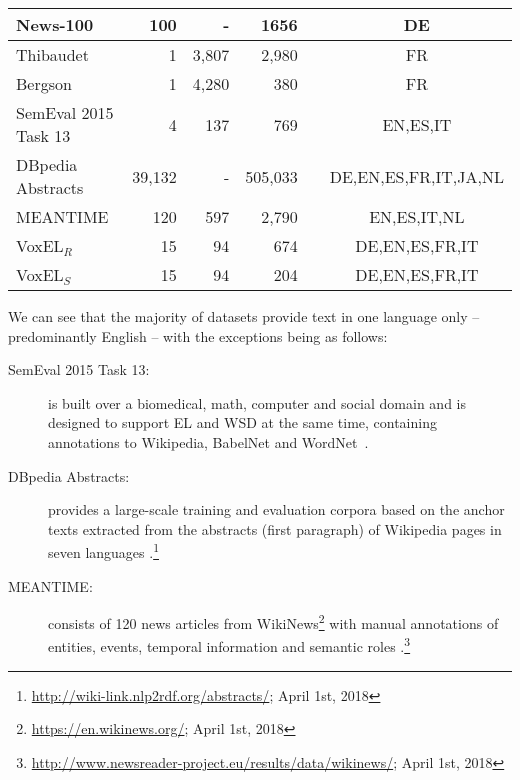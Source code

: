 \documentclass{llncs}
\newcommand{\cmark}{\ding{51}}%
\newcommand{\xmark}{\ding{55}}%
\begin{document}
\begin{table}[tb!]
{\begin{tabular}{lrrrcc}
News-100~\cite{n3}                  &100     &-      &1656    &\cmark  &DE \\\midrule
Thibaudet~\cite{renden2016}         &1       &3,807  &2,980   &\xmark  &FR \\\midrule
Bergson~\cite{renden2016}           &1       &4,280  &380     &\xmark  &FR \\\midrule
SemEval 2015 
Task 13~\cite{moro2015semeval}      &4       &137    &769     &\cmark &EN,ES,IT \\ \midrule
DBpedia Abstracts
~\cite{abstracts2016}               &39,132  &-      &505,033 &\xmark &DE,EN,ES,FR,IT,JA,NL \\\midrule
MEANTIME \cite{meantime2016}        &120     &597    &2,790   &\cmark &EN,ES,IT,NL \\\midrule 
VoxEL$_R$                           &15      &94     &674     &\cmark &DE,EN,ES,FR,IT\\\midrule  
VoxEL$_S$                           &15      &94     &204     &\cmark &DE,EN,ES,FR,IT\\ 
\bottomrule
\end{tabular}
}
\end{table}

We can see that the majority of datasets provide text in one language only -- predominantly English -- with the exceptions being as follows: 

\begin{description}
\item[SemEval 2015 Task 13:] is built over a biomedical, math, computer and social domain and is designed to support EL and WSD at the same time, containing annotations to Wikipedia, BabelNet and WordNet~\cite{moro2015semeval}.
\item[DBpedia Abstracts:] provides a large-scale training and evaluation corpora based on the anchor texts extracted from the abstracts (first paragraph) of Wikipedia pages in seven languages \cite{abstracts2016}.\footnote{\url{http://wiki-link.nlp2rdf.org/abstracts/}; April 1st, 2018} 
\item[MEANTIME:] consists of 120 news articles from WikiNews\footnote{\url{https://en.wikinews.org/}; April 1st, 2018} with manual annotations of entities, events, temporal information and semantic roles \cite{meantime2016}.\footnote{\url{http://www.newsreader-project.eu/results/data/wikinews/}; April 1st, 2018} 
\end{description}
\end{document}
